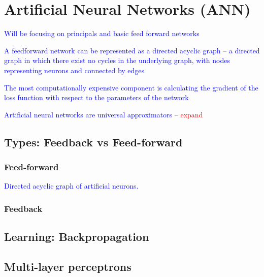 \section{Artificial Neural Networks (ANN)}

\textcolor{blue}{Will be focusing on principals and basic feed forward networks}


\textcolor{blue}{A feedforward network can be represented as a directed acyclic graph -- a directed graph in which there exist no cycles in the underlying graph, with nodes representing neurons and connected by edges}

\textcolor{blue}{The most computationally expensive component is calculating the gradient of the loss function with respect to the parameters of the network}

\textcolor{blue}{Artificial neural networks are {universal approximators} -- \textcolor{red}{expand}}

\subsection{Types: Feedback vs Feed-forward}

\subsubsection{Feed-forward}

\textcolor{blue}{Directed acyclic graph of artificial neurons.}

\subsubsection{Feedback}

\subsection{Learning: Backpropagation}

\subsection{Multi-layer perceptrons}